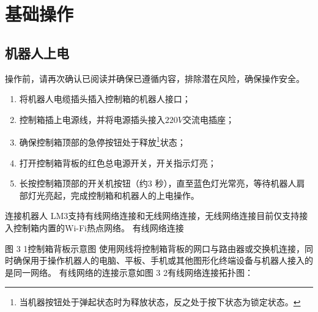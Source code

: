\chapter{基础操作}
\label{cha:基础操作}

\section{机器人上电}

操作前，请再次确认已阅读并确保已遵循内容，排除潜在风险，确保操作安全。

\begin{enumerate}
\item 将机器人电缆插头插入控制箱的机器人接口；
\item 控制箱插上电源线，并将电源插头接入$220 \unit{V}$交流电插座；
\item 确保控制箱顶部的急停按钮处于释放\footnote{当机器按钮处于弹起状态时为释放状态，反之处于按下状态为锁定状态。}状态；
\item 打开控制箱背板的红色总电源开关，开关指示灯亮；
\item 长按控制箱顶部的开关机按钮（约3 秒），直至蓝色灯光常亮，等待机器人肩部灯光亮起，完成控制箱和机器人的上电操作。
\end{enumerate}



连接机器⼈
LM3支持有线网络连接和无线网络连接，无线网络连接目前仅支持接入控制箱内置的Wi-Fi热点网络。
有线网络连接
 
图 3 1控制箱背板示意图
使用网线将控制箱背板的网口与路由器或交换机连接，同时确保用于操作机器人的电脑、平板、手机或其他图形化终端设备与机器人接入的是同一网络。
有线网络的连接示意如图 3 2有线网络连接拓扑图：
 
